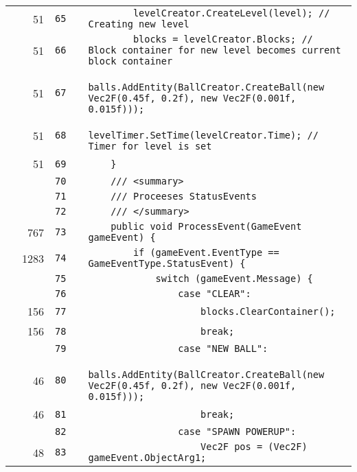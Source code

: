 \documentclass[a4paper,landscape,10pt]{article}
\begin{document}
\begin{longtable}[l]{lrrll}
\cellcolor{green} & 51 & \verb~65~ & & \verb~        levelCreator.CreateLevel(level); // Creating new level~\\
\cellcolor{green} & 51 & \verb~66~ & & \verb~        blocks = levelCreator.Blocks; // Block container for new level becomes current block container~\\
\cellcolor{green} & 51 & \verb~67~ & & \verb~        balls.AddEntity(BallCreator.CreateBall(new Vec2F(0.45f, 0.2f), new Vec2F(0.001f, 0.015f)));~\\
\cellcolor{green} & 51 & \verb~68~ & & \verb~        levelTimer.SetTime(levelCreator.Time); // Timer for level is set~\\
\cellcolor{green} & 51 & \verb~69~ & & \verb~    }~\\
\cellcolor{gray} &  & \verb~70~ & & \verb~    /// <summary>~\\
\cellcolor{gray} &  & \verb~71~ & & \verb~    /// Proceeses StatusEvents~\\
\cellcolor{gray} &  & \verb~72~ & & \verb~    /// </summary>~\\
\cellcolor{green} & 767 & \verb~73~ & & \verb~    public void ProcessEvent(GameEvent gameEvent) {~\\
\cellcolor{green} & 1283 & \verb~74~ & & \verb~        if (gameEvent.EventType == GameEventType.StatusEvent) {~\\
\cellcolor{gray} &  & \verb~75~ & & \verb~            switch (gameEvent.Message) {~\\
\cellcolor{gray} &  & \verb~76~ & & \verb~                case "CLEAR":~\\
\cellcolor{green} & 156 & \verb~77~ & & \verb~                    blocks.ClearContainer();~\\
\cellcolor{green} & 156 & \verb~78~ & & \verb~                    break;~\\
\cellcolor{gray} &  & \verb~79~ & & \verb~                case "NEW BALL":~\\
\cellcolor{green} & 46 & \verb~80~ & & \verb~                    balls.AddEntity(BallCreator.CreateBall(new Vec2F(0.45f, 0.2f), new Vec2F(0.001f, 0.015f)));~\\
\cellcolor{green} & 46 & \verb~81~ & & \verb~                    break;~\\
\cellcolor{gray} &  & \verb~82~ & & \verb~                case "SPAWN POWERUP":~\\
\cellcolor{green} & 48 & \verb~83~ & & \verb~                    Vec2F pos = (Vec2F) gameEvent.ObjectArg1;~\\

\end{longtable}
\end{document}
